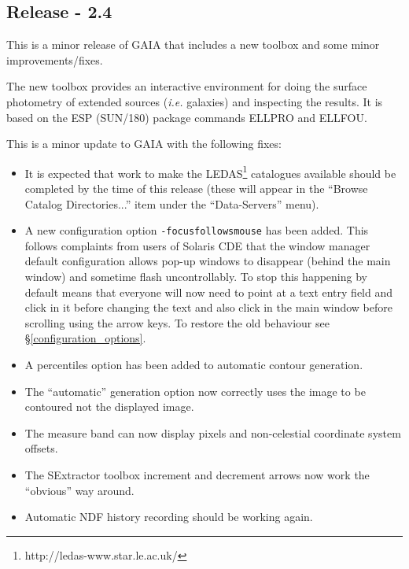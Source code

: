 \documentclass[twoside,11pt]{article}
\newcommand{\htmladdnormallinkfoot}[2]{#1\footnote{#2}}
\newcommand{\hyperref}[4]{#2\ref{#4}#3}
\newcommand{\xref}[3]{#1}
\renewcommand{\_}{\texttt{\symbol{95}}}
\newcommand{\mytt}[1]{{\texttt{#1}}}
\begin{document}
\subsection{Release - 2.4}
This is a minor release of GAIA that includes a new toolbox and some
minor improvements/fixes.

The new toolbox provides an interactive environment for doing the
surface photometry of extended sources ({\em i.e.} galaxies) and inspecting
the results. It is based on the ESP (\xref{SUN/180}{sun180}{}) package
commands ELLPRO and ELLFOU.

This is a minor update to GAIA with the following fixes:
\begin{itemize}
\item It is expected that work to make the
      \htmladdnormallinkfoot{LEDAS}{http://ledas-www.star.le.ac.uk/}
      catalogues available should be completed by the time of this
      release (these will appear in the ``Browse Catalog
      Directories...'' item under the ``Data-Servers'' menu).

\item A new configuration option \mytt{-focus\_follows\_mouse} has been
      added. This follows complaints from users of Solaris CDE that
      the window manager default configuration allows pop-up windows
      to disappear (behind the main window) and sometime flash
      uncontrollably. To stop this happening by default means that
      everyone will now need to point at a text entry field and click
      in it before changing the text and also click in the main window
      before scrolling using the arrow keys. To restore the old
      behaviour see
      \hyperref{configuration options}{\S}{}{configuration_options}.

\item A percentiles option has been added to automatic contour
      generation.

\item The ``automatic'' generation option now correctly uses the image
      to be contoured not the displayed image.

\item The measure band can now display pixels and non-celestial
      coordinate system offsets.

\item The SExtractor toolbox increment and decrement arrows now work
      the ``obvious'' way around.

\item Automatic NDF history recording should be working again.


\end{itemize}
\end{document}
